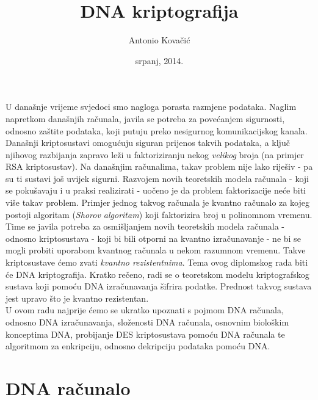 \documentclass[a4paper,oneside,12pt]{memoir} %
\title{DNA kriptografija}
\author{Antonio Kovačić}
\date{srpanj, 2014.}  %
\begin{document}
\begin{spacing}{1.5}
\frontmatter


\begin{intro}

U današnje vrijeme svjedoci smo nagloga porasta razmjene podataka. Naglim napretkom današnjih računala, javila se potreba za povećanjem sigurnosti, odnosno zaštite podataka, koji putuju preko nesigurnog komunikacijskog kanala. Današnji kriptosustavi omogućuju siguran prijenos takvih podataka, a ključ njihovog razbijanja zapravo leži u faktoriziranju nekog \textit{velikog} broja (na primjer \textsc{RSA} kriptosustav). Na današnjim računalima, takav problem nije lako riješiv - pa su ti sustavi još uvijek sigurni. Razvojem novih teoretskih modela računala - koji se pokušavaju i u praksi realizirati - uočeno je da problem faktorizacije neće biti više takav problem. Primjer jednog takvog računala je kvantno računalo za kojeg postoji algoritam (\textit{Shorov algoritam}) koji faktorizira broj u polinomnom vremenu.
Time se javila potreba za osmišljanjem  novih teoretskih modela računala - odnosno kriptosustava - koji bi bili otporni na kvantno izračunavanje - ne bi se mogli probiti uporabom kvantnog računala u nekom razumnom vremenu. Takve kriptosustave ćemo zvati \textit{kvantno rezistentnima}.
Tema ovog diplomskog rada biti će DNA kriptografija. Kratko rečeno, radi se o teoretskom modelu kriptografskog sustava koji pomoću DNA izračunavanja šifrira podatke. Prednost takvog sustava jest upravo što je kvantno rezistentan.\\[0.2cm]
U ovom radu najprije ćemo se ukratko upoznati s pojmom DNA računala, odnosno DNA izračunavanja, složenosti DNA računala, osnovnim biološkim konceptima DNA, probijanje DES kriptosustava pomoću DNA računala te algoritmom za enkripciju, odnosno dekripciju podataka pomoću DNA.
\end{intro}
\chapter{DNA računalo}

\end{spacing}
\end{document}
